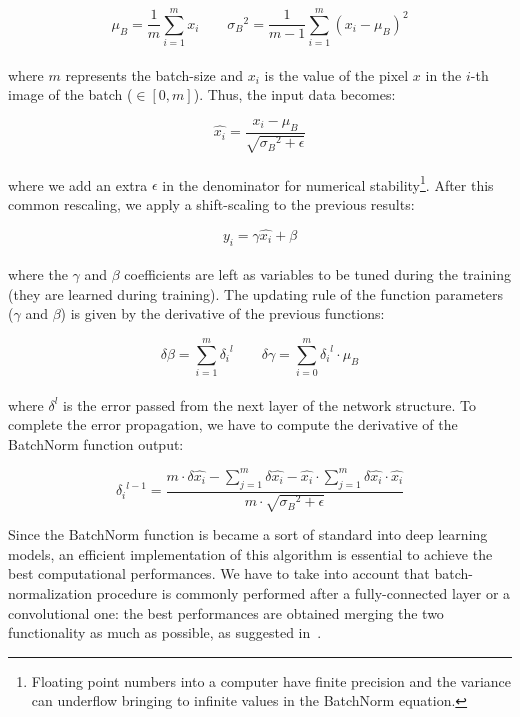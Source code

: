 \documentclass{standalone}
\begin{document}
\begin{equation}
\mu_B = \frac{1}{m}\sum_{i=1}^{m}x_i \quad\quad {\sigma_B}^2 = \frac{1}{m-1}\sum_{i=1}^{m}(x_i - \mu_B)^2
\end{equation}
\\
where $m$ represents the batch-size and $x_i$ is the value of the pixel $x$ in the $i$-th image of the batch ($\in[0, m]$).
Thus, the input data becomes:

\begin{equation}
\hat{x_i} = \frac{x_i - \mu_B}{\sqrt{{\sigma_B}^2 + \epsilon}}
\end{equation}
\\
where we add an extra $\epsilon$ in the denominator for numerical stability\footnote{
  Floating point numbers into a computer have finite precision and the variance can underflow bringing to infinite values in the BatchNorm equation.
}.
After this common rescaling, we apply a shift-scaling to the previous results:

\begin{equation}
y_i = \gamma\hat{x_i} + \beta
\end{equation}
\\
where the $\gamma$ and $\beta$ coefficients are left as variables to be tuned during the training (they are learned during training).
The updating rule of the function parameters ($\gamma$ and $\beta$) is given by the derivative of the previous functions:

\begin{equation}
\delta\beta = \sum_{i=1}^{m}{\delta_i}^l \quad\quad \delta\gamma = \sum_{i=0}^{m} {\delta_i}^l \cdot \mu_B
\end{equation}
\\
where $\delta^l$ is the error passed from the next layer of the network structure.
To complete the error propagation, we have to compute the derivative of the BatchNorm function output:

\begin{equation}
{\delta_i}^{l-1} = \frac{{m}\cdot \delta\hat{x_i} - \sum_{j=1}^{m}\delta\hat{x_i} - \hat{x_i} \cdot \sum_{j=1}^{m} \delta\hat{x_i} \cdot \hat{x_i}}{m \cdot \sqrt{{\sigma_B}^2 + \epsilon} }
\end{equation}

Since the BatchNorm function is became a sort of standard into deep learning models, an efficient implementation of this algorithm is essential to achieve the best computational performances.
We have to take into account that batch-normalization procedure is commonly performed after a fully-connected layer or a convolutional one: the best performances are obtained merging the two functionality as much as possible, as suggested in~\cite{AlexeyAB}.
\end{document}
